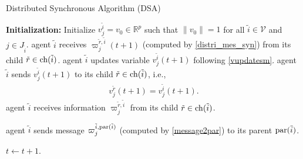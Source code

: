\documentclass[journal]{IEEEtran}
\begin{document}
\begin{algorithm}[H]
	\caption{Distributed Synchronous Algorithm (DSA)}
	\label{algo_sum}
	\begin{algorithmic}[1]  %
		\State  \textbf{Initialization:}  Initialize  $v_j^{\tilde{i}}=v_0\in\mathbb R^p$ such that $\|v_0\|=1$ for all  $\tilde{i}\in\mathcal V$ and $j\in J_{\tilde{i}}$.
		\State agent $\tilde{i}$ receives $\varpi_j^{\tilde{r},\tilde{i}}(t+1)$ (computed by \eqref{distri_mes_syn}) from its child $\tilde{r}\in {\rm ch}(\tilde{i})$.
		\EndIf
		\State   agent $\tilde{i}$ updates variable $v^{\tilde{i}}_j(t+1)$ following \eqref{vupdatesm}.
		\State  agent $\tilde{i}$ sends $v_j^{\tilde{i}}(t+1)$ to its child $\tilde{r}\in{\rm ch}(\tilde{i})$, i.e., 
		\begin{align}\label{syn_sup}
			v_j^{\tilde{r}}(t+1)=v_j^{\tilde{i}}(t+1).
		\end{align}
		\EndIf
		\EndFor
		\State agent $\tilde{i}$ receives information $\varpi_j^{\tilde{r},\tilde{i}}$ from its child $\tilde{r}\in {\rm ch}(\tilde{i})$.
		\EndIf
		
		\State agent $\tilde{i}$ sends message $\varpi_j^{\tilde{i},{\rm par}(\tilde{i})}$ (computed by \eqref{message2par}) to its parent ${\rm par}(\tilde{i})$.
		
		\EndFor
		\EndFor
		\State $t\leftarrow t+1$.
		\EndWhile
	\end{algorithmic}
\end{algorithm}
\end{document}
